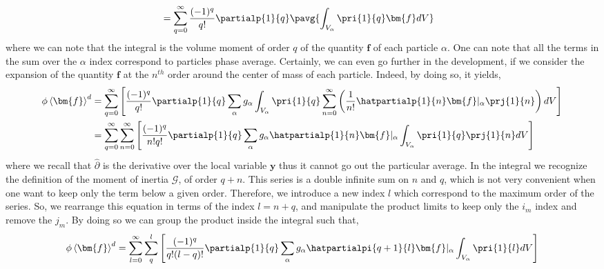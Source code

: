 {\begin{align}
    \label{eq:monoexp}
    &= \sum_{q=0}^\infty \frac{(-1)^q}{q!} \partialp{1}{q} 
        \pavg{\int_{V_\alpha} \pri{1}{q} \bm{f}  dV}
\end{align}
where we can note that the integral is the volume moment of order $q$ of the quantity $\bm{f}$ of each particle $\alpha$.
One can note that all the terms in the sum over the $\alpha$ index correspond to particles phase average.
Certainly, we can even go further in the development, if we consider the expansion of the quantity $\bm{f}$ at the $n^{th}$ order around the center of mass of each particle.
Indeed, by doing so, it yields,
\begin{align*}
    \phi\left<\bm{f}\right>^d &= \sum_{q=0}^\infty \left[\frac{(-1)^q}{q!} \partialp{1}{q} \sum_{\alpha} g_\alpha \int_{V_\alpha} \pri{1}{q} \sum_{n=0}^\infty \left(
        \frac{1}{n!} \hatpartialp{1}{n}\bm{f}|_\alpha \prj{1}{n}
    \right) dV\right]\\
    &= \sum_{q=0}^\infty \sum_{n=0}^\infty\left[\frac{(-1)^q}{n!q!} \partialp{1}{q} \sum_{\alpha} g_\alpha 
    \hatpartialp{1}{n}\bm{f}|_\alpha 
    \int_{V_\alpha} \pri{1}{q}  
        \prj{1}{n}
    dV\right] 
\end{align*}
where we recall that $\hat{\partial}$ is the derivative over the local variable $\bm{y}$ thus it cannot go out the particular average.  
In the integral we recognize the definition of the moment of inertia $\mathcal{G}$, of order $q+n$. 
This series is a double infinite sum on $n$ and $q$, which is not very convenient when one want to keep only the term below a given order. 
Therefore, we introduce a new index $l$ which correspond to the maximum order of the series. 
So, we rearrange this equation in terms of the index $l = n + q$, and manipulate the product limits to keep only the $i_m$ index and remove the $j_m$.
By doing so we can group the product inside the integral such that, 
\begin{equation*}
    \phi\left<\bm{f}\right>^d 
    = \sum_{l=0}^\infty \sum_{q}^l\left[\frac{(-1)^{q}}{q!(l-q)!} \partialp{1}{q} \sum_{\alpha} g_\alpha 
    \hatpartialpi{q+1}{l}\bm{f}|_\alpha 
    \int_{V_\alpha} 
        \pri{1}{l}  
    dV\right] 

\end{equation*}}
